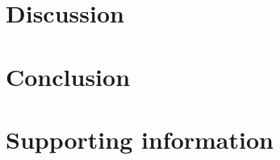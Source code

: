\documentclass[10pt,letterpaper]{article}
\newlength\savedwidth
\newcommand\thickhline{\noalign{\global\savedwidth\arrayrulewidth\global\arrayrulewidth 2pt}%
\hline
\noalign{\global\arrayrulewidth\savedwidth}}
\begin{document}



\section*{Discussion}

\section*{Conclusion}

\section*{Supporting information}

\end{document}
